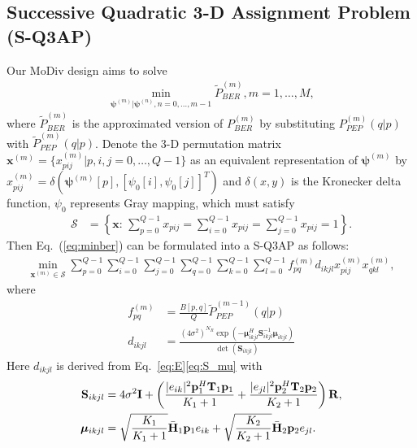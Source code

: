 \documentclass[journal]{IEEEtran}
\begin{document}
\subsection{Successive Quadratic 3-D Assignment Problem (S-Q3AP)}
\label{ssec:q3ap}
Our MoDiv design aims to solve
\begin{align}
  \min_{\bm{\psi}^{(m)}|\bm{\psi}^{(n)},
  n=0,\ldots,m-1}\tilde{P}_{BER}^{(m)},m=1,\ldots,M,\label{eq:minber}
\end{align}
where $\tilde{P}_{BER}^{(m)}$ is the approximated version of
$P_{BER}^{(m)}$ by substituting $P_{PEP}^{(m)}(q|p)$ with
$\tilde{P}_{PEP}^{(m)}(q|p)$. Denote the 3-D permutation matrix
$\mathbf{x}^{(m)} = \{x_{pij}^{(m)}|p,i,j=0,\ldots,Q-1\}$ as an equivalent
representation of $\bm{\psi}^{(m)}$ by $x_{pij}^{(m)} =
\delta(\bm{\psi}^{(m)}[p], [\psi_0[i], \psi_0[j]]^T)$ and $\delta(x,y)$ is the
Kronecker delta function, $\psi_0$ represents Gray mapping, which must satisfy
\begin{align}
  \mathcal{S} & = \left\{\mathbf{x}:\,\sum_{p=0}^{Q-1}x_{pij}=
  \sum_{i=0}^{Q-1}x_{pij} =\sum_{j=0}^{Q-1}x_{pij} =1\right\}.
  \label{eq:constraint}
\end{align}
Then Eq.~(\ref{eq:minber}) can be formulated into a S-Q3AP as follows:
\begin{align}
  \min_{\mathbf{x}^{(m)}\in \mathcal{S}}
  \sum_{p=0}^{Q-1}\sum_{i=0}^{Q-1}\sum_{j=0}^{Q-1}
  \sum_{q=0}^{Q-1}\sum_{k=0}^{Q-1}\sum_{l=0}^{Q-1}
  f_{pq}^{(m)}d_{ikjl}x_{pij}^{(m)}x_{qkl}^{(m)},
  \label{eq:SQ3AP}
\end{align}
where
\begin{subequations}
  \begin{align}
    f_{pq}^{(m)} & = \frac{B[p,q]}{Q}\tilde{P}_{PEP}^{(m-1)}(q|p) \\
    d_{ikjl} & =
    \frac{(4\sigma^2)^{N_R}
    \exp(-\bm{\mu}_{ikjl}^H\mathbf{S}_{ikjl}^{-1}\bm{\mu}_{ikjl})} {\det(\mathbf{S}_{ikjl})}
  \end{align}
\end{subequations}
Here $d_{ikjl}$ is derived from Eq.~\eqref{eq:E}\eqref{eq:S_mu} with
\begin{align}
  \mathbf{S}_{ikjl} & = 4\sigma^2\mathbf{I} + \left(\frac{|e_{ik}|^2
  \mathbf{p}_1^H\mathbf{T}_1 \mathbf{p}_1}{K_1+1} + \frac{|e_{jl}|^2
  \mathbf{p}_2^H\mathbf{T}_2 \mathbf{p}_2}{K_2+1}\right) \mathbf{R},\notag\\
  \bm{\mu}_{ikjl} & = \sqrt{\frac{K_1}{K_1+1}}\bar{\mathbf{H}}_1\mathbf{p}_1
  e_{ik} + \sqrt{\frac{K_2}{K_2+1}}\bar{\mathbf{H}}_2\mathbf{p}_2e_{jl}.
\end{align}
\end{document}
